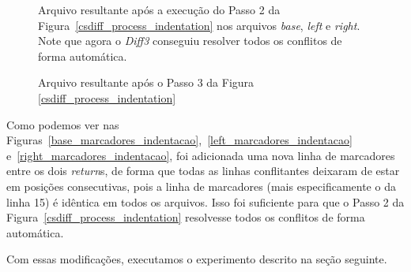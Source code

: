 \begin{figure}[ht]
	\begin{center}
		
		\caption{Arquivo resultante após a execução do Passo 2 da Figura~\ref{csdiff_process_indentation} nos arquivos
			\emph{base}, \emph{left} e \emph{right}. Note que agora o \emph{Diff3} conseguiu resolver todos
			os conflitos de forma automática.
		}\label{diff3_marcadores_indentacao}
	\end{center}
\end{figure}

\begin{figure}[ht]
	\begin{center}
		
		\caption{Arquivo resultante após o Passo 3 da Figura
			\ref{csdiff_process_indentation}}\label{csdiff_indentacao}
	\end{center}
\end{figure}

Como podemos ver nas
Figuras~\ref{base_marcadores_indentacao},~\ref{left_marcadores_indentacao}
e~\ref{right_marcadores_indentacao}, foi adicionada uma nova linha de
marcadores entre os dois \emph{return}s, de forma que todas as linhas
conflitantes deixaram de estar em posições consecutivas, pois a linha de
marcadores (mais especificamente o da linha 15) é idêntica em todos os
arquivos. Isso foi suficiente para que o Passo 2 da
Figura~\ref{csdiff_process_indentation} resolvesse todos os conflitos de forma
automática.

Com essas modificações, executamos o experimento descrito na seção seguinte.

